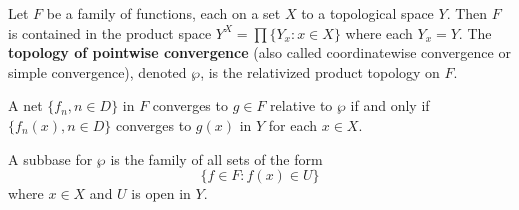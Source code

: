 Let $F$ be a family of functions, each on a set $X$ to a topological space $Y$. Then $F$ is contained in the product space $Y^X = \prod \{Y_x : x \in X\}$ where each $Y_x = Y$. The \textbf{topology of pointwise convergence} (also called coordinatewise convergence or simple convergence), denoted $\wp$, is the relativized product topology on $F$.

A net $\{f_n, n \in D\}$ in $F$ converges to $g \in F$ relative to $\wp$ if and only if $\{f_n(x), n \in D\}$ converges to $g(x)$ in $Y$ for each $x \in X$.

A subbase for $\wp$ is the family of all sets of the form
$$\{f \in F : f(x) \in U\}$$
where $x \in X$ and $U$ is open in $Y$.

